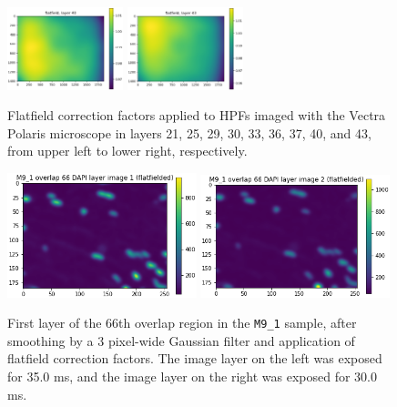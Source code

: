 \documentclass[letterpaper,11pt]{article}
\begin{document}
\begin{figure}[!ht]
\includegraphics[width=0.3\textwidth]{images/methods/flatfield_layers_polaris/flatfield_layer_40}
\includegraphics[width=0.3\textwidth]{images/methods/flatfield_layers_polaris/flatfield_layer_43}
\caption{\footnotesize Flatfield correction factors applied to HPFs imaged with the Vectra Polaris microscope in layers 21, 25, 29, 30, 33, 36, 37, 40, and 43, from upper left to lower right, respectively.}
\label{fig:applied_flatfield_layers_polaris_2}
\end{figure}

\begin{figure}[!ht]
\centering
\includegraphics[width=0.49\textwidth]{images/methods/smoothed_flatfielded_M9_1_overlap_66_dapi_image_1}
\includegraphics[width=0.49\textwidth]{images/methods/smoothed_flatfielded_M9_1_overlap_66_dapi_image_2}
\caption{\footnotesize First layer of the 66th overlap region in the \texttt{M9\_1} sample, after smoothing by a 3 pixel-wide Gaussian filter and application of flatfield correction factors. The image layer on the left was exposed for 35.0 ms, and the image layer on the right was exposed for 30.0 ms.}
\label{fig:smoothed_flatfielded_M9_1_overlap_66}
\end{figure}
\end{document}
